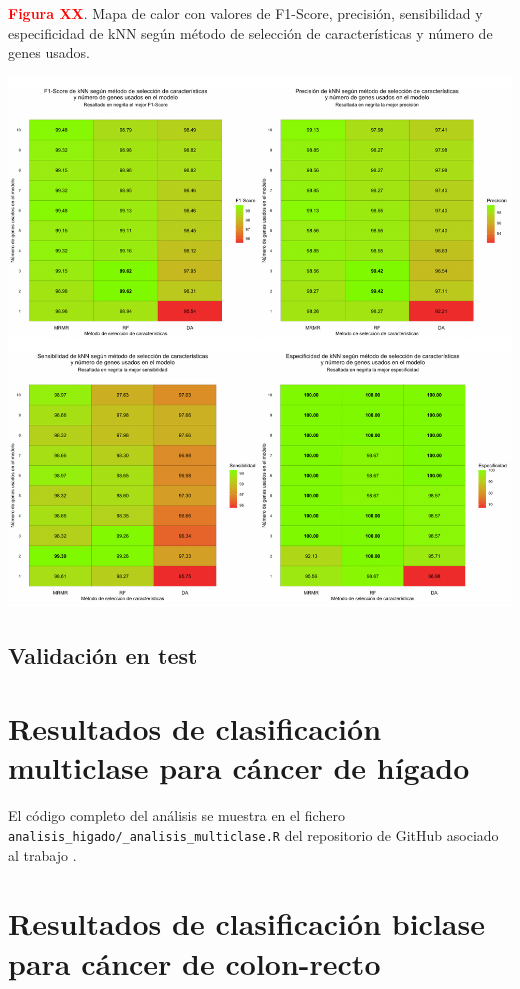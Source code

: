 \newpage
\textbf{\textcolor{red}{Figura XX}}. Mapa de calor con valores de F1-Score, precisión, sensibilidad y especificidad de kNN según método de selección de características y número de genes usados.
\begin{center}
	\includegraphics[width=1\textwidth]{figuras/higado_biclase_heatmap_knn.pdf} \\
\end{center}
\newpage

\subsection{Validación en test}

\section{Resultados de clasificación multiclase para cáncer de hígado}

El código completo del análisis se muestra en el fichero \texttt{analisis\_higado/\_analisis\_multiclase.R} del repositorio de GitHub asociado al trabajo \cite{Redondo-Sanchez2020}.\\

\section{Resultados de clasificación biclase para cáncer de colon-recto}

